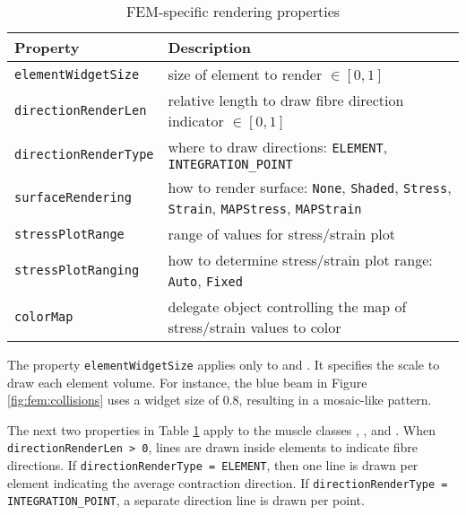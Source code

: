 \begin{table}[ht]
	\centering
	\caption{FEM-specific rendering properties} \label{tbl:fem:rendering}
	\begin{tabular}{lp{}}
		\hline\hline
		Property & Description\\
		\hline
	   {\tt elementWidgetSize} & size of element to render $\in [0,1]$\\
	   {\tt directionRenderLen} & relative length to draw fibre direction indicator $\in [0, 1]$\\
	   {\tt directionRenderType} & where to draw directions: {\tt ELEMENT}, {\tt INTEGRATION\_POINT}\\
	   {\tt surfaceRendering} & how to render surface: {\tt None}, {\tt Shaded}, {\tt Stress}, {\tt Strain}, {\tt MAPStress}, {\tt MAPStrain}\\
	   {\tt stressPlotRange} & range of values for stress/strain plot\\
	   {\tt stressPlotRanging} & how to determine stress/strain plot range: {\tt Auto}, {\tt Fixed}\\
	   {\tt colorMap} & delegate object controlling the map of stress/strain values to color\\
	   \hline
	\end{tabular}
\end{table}

The property {\tt elementWidgetSize} applies only to 
 and
.  It specifies the scale to
draw each element volume.  For instance, the blue beam in Figure \ref{fig:fem:collisions}
uses a widget size of 0.8, resulting in a mosaic-like pattern.

The next two properties in Table \ref{tbl:fem:rendering} apply to the
muscle classes
, 
, and
\pdfbreak
{}.
When {\tt directionRenderLen > 0}, lines are drawn inside elements to indicate fibre
directions.  If {\tt directionRenderType = ELEMENT}, then one line is drawn per
element indicating the average contraction direction.  If 
{\tt directionRenderType = INTEGRATION\_POINT}, a separate direction line is drawn 
per point.

